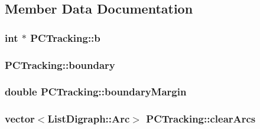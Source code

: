 \subsection{\-Member \-Data \-Documentation}
\hypertarget{class_p_c_tracking_a418a08ae505fdd999e84c8cc11e00557}{
\subsubsection[{b}]{\setlength{\rightskip}{0pt plus 5cm}int $\ast$ {\bf \-P\-C\-Tracking\-::b}}}\label{class_p_c_tracking_a418a08ae505fdd999e84c8cc11e00557}
\hypertarget{class_p_c_tracking_a3cbc2f6326c28bc2d136dcb53dac1a5f}{
\subsubsection[{boundary}]{ {\bf \-P\-C\-Tracking\-::boundary}}}\label{class_p_c_tracking_a3cbc2f6326c28bc2d136dcb53dac1a5f}
\hypertarget{class_p_c_tracking_a9450eac64c156b259c0c2426b0344f75}{
\subsubsection[{boundary\-Margin}]{\setlength{\rightskip}{0pt plus 5cm}double {\bf \-P\-C\-Tracking\-::boundary\-Margin}}}\label{class_p_c_tracking_a9450eac64c156b259c0c2426b0344f75}
\hypertarget{class_p_c_tracking_aa7ecd7598977c022ffabbb7e74c80d28}{
\subsubsection[{clear\-Arcs}]{\setlength{\rightskip}{0pt plus 5cm}vector$<$\-List\-Digraph\-::\-Arc$>$ {\bf \-P\-C\-Tracking\-::clear\-Arcs}}}\label{class_p_c_tracking_aa7ecd7598977c022ffabbb7e74c80d28}
